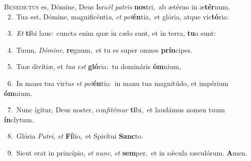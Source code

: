\lettrine{\initial\textcolor{\initialcolor}{B}}{enedíctus} es, Dómine, Deus Isra\textit{ël} \textit{pa}\-\textit{tris} \textbf{nos}\-tri,~\star ab ætérno in æ\-\textbf{tér}\-num.\\
{\numbfont\textcolor{\numbcolor}{~2.}}~Tua est, Dómine, magnificénti\-\textit{a}\-, \textit{et} \textit{pot}\-\textbf{én}tia,~\star et glória, atque vic\-\textbf{tó}\-ria:\par
{\numbfont\textcolor{\numbcolor}{~3.}}~\textit{Et} \textbf{ti}\-bi laus:~\star cuncta enim quæ in cælo sunt, et in terra, \textbf{tu}\-a sunt:\par
{\numbfont\textcolor{\numbcolor}{~4.}}~Tuum, \textit{Dó}\-\textit{mi}\textit{ne}, \textbf{re}\-gnum,~\star et tu es super omnes \textbf{prín}\-cipes.\par
{\numbfont\textcolor{\numbcolor}{~5.}}~Tuæ divítiæ, et \textit{tu}\-\textit{a} \textit{est} \textbf{gló}\-ria:~\star tu domináris \textbf{óm}\-nium,\par
{\numbfont\textcolor{\numbcolor}{~6.}}~In manu tua vir\textit{tus} \textit{et} \textit{pot}\-\textbf{én}tia:~\star in manu tua magnitúdo, et impérium \textbf{óm}\-nium.\par
{\numbfont\textcolor{\numbcolor}{~7.}}~Nunc ígitur, Deus noster, con\-\textit{fi}\-\textit{té}\textit{mur} \textbf{ti}\-bi,~\star et laudámus nomen tuum \textbf{ín}\-clytum.\par
{\numbfont\textcolor{\numbcolor}{~8.}}~Glória \textit{Pa}\-\textit{tri}, \textit{et} \textbf{Fí}\-lio,~\star et Spirítui \textbf{Sanc}\-to.\par
{\numbfont\textcolor{\numbcolor}{~9.}}~Sicut erat in princípio, \textit{et} \textit{nunc}\-, \textit{et} \textbf{sem}\-per,~\star et in sǽcula sæculórum. \textbf{A}\-men.\par
